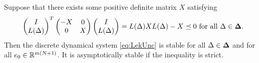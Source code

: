 \begin{theo}
	\label{thm:Lyap}
	Suppose that there exists some positive definite matrix $X$ satisfying 
	\begin{align}
	\label{eq:Lyap}
	\begin{pmatrix}
	I \\ L(\Delta) 
	\end{pmatrix}^T
	\begin{pmatrix}
	-X & 0 \\ 0 & X
	\end{pmatrix}
	\begin{pmatrix}
	I \\ L(\Delta) 
	\end{pmatrix} = L(\Delta)X L(\Delta) - X \preceq 0 \text{ for all } \Delta \in \mathbf{\Delta}.
	\end{align}
	Then the discrete dynamical system \eqref{eq:LekUnc} 
	is stable for all $\Delta \in \mathbf{\Delta}$ and for all $e_0 \in {\mathbb{R}}^{m ( N+1)}$.
	It is asymptotically stable if the inequality is strict. 
\end{theo}
